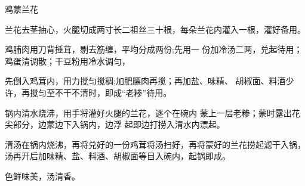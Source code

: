 \begin{recipe}{鸡蒙兰花}

\ingredients


\cooking

\step 兰花去茎抽心，火腿切成两寸长二祖丝三十根，每朵兰花内灌入一根，灌好备用。

鸡脯肉用刀背捶茸，剔去筋缠，平均分成两份;先用一 份加冷汤二两，兑起待用；鸡蛋清调散；干豆粉用冷水调匀，

先倒入鸡茸内，用力搅匀搅稠;加肥膘肉再搅；再加盐、味精、 胡椒面、料酒少许，再搅匀至不干不清时，即成“老糁”待用。

锅内清水烧沸，用手将灌好火腿的兰花，逐个在碗内 蒙上一层老糁；蒙时露出花尖部分，边蒙边下入锅内，边浮 起即边打捞入清水内漂起。

\step 清汤在锅内烧沸，再将兑好的一份鸡茸将汤扫好，再将蒙好的兰花捞起滤干入锅，汤再开后加味精、盐、料酒、胡椒面等目入碗内，起锅即成。

\notes

色鲜味美，汤清香。

\end{recipe}

